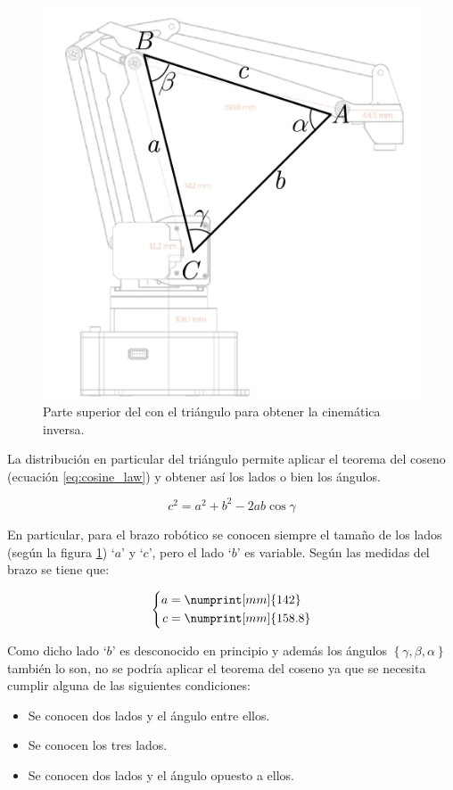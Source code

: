 \begin{figure}[H]
    \centering
    \includegraphics[width=.5\linewidth]{pictures/ik_cosine_law_over_arm.png}
    \caption{Parte superior del \pArm{} con el triángulo para obtener la cinemática inversa.}
    \label{fig:ik_over_arm}
\end{figure}

La distribución en particular del triángulo permite aplicar el teorema del coseno (ecuación
\ref{eq:cosine_law}) y obtener así los lados o bien los ángulos.

\begin{equation}\label{eq:cosine_law}
    c^2 = a^2 + b^2 - 2ab\cos{\gamma}
\end{equation}

En particular, para el brazo robótico se conocen siempre el tamaño de los lados
(según la figura \ref{fig:ik_over_arm}) `$a$' y `$c$', pero el lado `$b$' es variable. Según las
medidas del brazo se tiene que:

\begin{equation*}
    \left\{
    \begin{aligned}
        a & = \numprint[mm]{142}   \\
        c & = \numprint[mm]{158.8}
    \end{aligned}
    \right.
\end{equation*}

Como dicho lado `$b$' es desconocido en principio y además los ángulos $\left\{\gamma, \beta, \alpha\right\}$
también lo son, no se podría aplicar el teorema del coseno ya que se necesita cumplir alguna de las
siguientes condiciones:

\begin{itemize}
    \item Se conocen dos lados y el ángulo entre ellos.
    \item Se conocen los tres lados.
    \item Se conocen dos lados y el ángulo opuesto a ellos.
\end{itemize}

